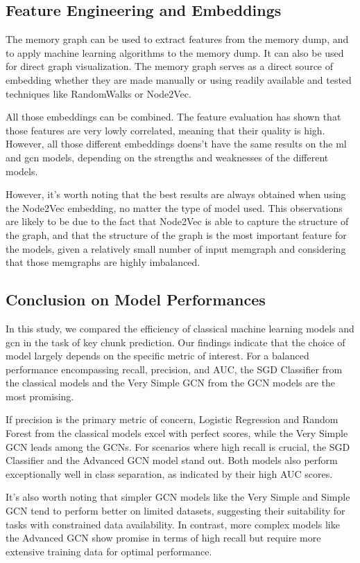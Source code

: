 \subsection{Feature Engineering and Embeddings}
The memory graph can be used to extract features from the memory dump, and to apply machine learning algorithms to the memory dump. It can also be used for direct graph visualization. The memory graph serves as a direct source of embedding whether they are made manually or using readily available and tested techniques like RandomWalks or Node2Vec.

All those embeddings can be combined. The feature evaluation has shown that those features are very lowly correlated, meaning that their quality is high. However, all those different embeddings doens't have the same results on the \acrshort{ml} and \acrshort{gcn} models, depending on the strengths and weaknesses of the different models. 

However, it's worth noting that the best results are always obtained when using the Node2Vec embedding, no matter the 
type of model used. This observations are likely to be due to the fact that Node2Vec is able to capture the structure of the graph, and that the structure of the graph is the most important feature for the models, given a relatively small number of input memgraph and considering that those memgraphs are highly imbalanced.

\subsection{Conclusion on Model Performances}

In this study, we compared the efficiency of classical machine learning models and \acrfull{gcn} in the task of key chunk prediction. Our findings indicate that the choice of model largely depends on the specific metric of interest. For a balanced performance encompassing recall, precision, and AUC, the SGD Classifier from the classical models and the Very Simple GCN from the GCN models are the most promising. 

If precision is the primary metric of concern, Logistic Regression and Random Forest from the classical models excel with perfect scores, while the Very Simple GCN leads among the GCNs. For scenarios where high recall is crucial, the SGD Classifier and the Advanced GCN model stand out. Both models also perform exceptionally well in class separation, as indicated by their high AUC scores.

It's also worth noting that simpler GCN models like the Very Simple and Simple GCN tend to perform better on limited datasets, suggesting their suitability for tasks with constrained data availability. In contrast, more complex models like the Advanced GCN show promise in terms of high recall but require more extensive training data for optimal performance.

